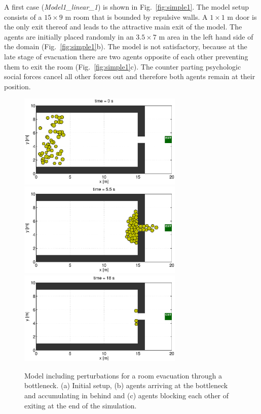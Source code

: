 \documentclass[11pt]{article}
\begin{document}
A first case ({\it Model1\_linear\_1}) is shown in Fig.~\ref{fig:simple1}. The model setup consists of a $15\times9$ m room that is bounded by repulsive walls. A $1\times1$ m door is the only exit thereof and leads to the attractive main exit of the model. The agents are initially placed randomly in an $3.5\times7$ m area in the left hand side of the domain (Fig.~\ref{fig:simple1}b). The model is not satisfactory, because at the late stage of evacuation there are two agents opposite of each other preventing them to exit the room (Fig.~\ref{fig:simple1}c). The counter parting psychologic social forces cancel all other forces out and therefore both agents remain at their position.

\begin{figure}
	\begin{center}
	\includegraphics[width=0.7\textwidth]
	{figures/Model1_direct_2b_000000.eps}
	\qquad
	\includegraphics[width=0.7\textwidth]
	{figures/Model1_direct_2b_000550.eps}
	\qquad
	\includegraphics[width=0.7\textwidth]
	{figures/Model1_direct_2b_001800.eps}
	\caption{Model including perturbations for a room evacuation through a bottleneck. (a) Initial setup, (b) agents arriving at the bottleneck and accumulating in behind and (c) agents blocking each other of exiting at the end of the simulation.}
	\label{fig:simple2}
	\end{center}
\end{figure}
\end{document}
